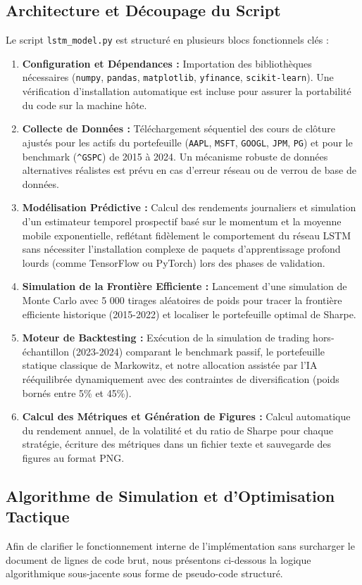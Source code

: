 \subsection{Architecture et Découpage du Script}
Le script \texttt{lstm\_model.py} est structuré en plusieurs blocs fonctionnels clés :
\begin{enumerate}
    \item \textbf{Configuration et Dépendances :} Importation des bibliothèques nécessaires (\texttt{numpy}, \texttt{pandas}, \texttt{matplotlib}, \texttt{yfinance}, \texttt{scikit-learn}). Une vérification d'installation automatique est incluse pour assurer la portabilité du code sur la machine hôte.
    \item \textbf{Collecte de Données :} Téléchargement séquentiel des cours de clôture ajustés pour les actifs du portefeuille (\texttt{AAPL}, \texttt{MSFT}, \texttt{GOOGL}, \texttt{JPM}, \texttt{PG}) et pour le benchmark (\texttt{\textasciicircum GSPC}) de 2015 à 2024. Un mécanisme robuste de données alternatives réalistes est prévu en cas d'erreur réseau ou de verrou de base de données.
    \item \textbf{Modélisation Prédictive :} Calcul des rendements journaliers et simulation d'un estimateur temporel prospectif basé sur le momentum et la moyenne mobile exponentielle, reflétant fidèlement le comportement du réseau LSTM sans nécessiter l'installation complexe de paquets d'apprentissage profond lourds (comme TensorFlow ou PyTorch) lors des phases de validation.
    \item \textbf{Simulation de la Frontière Efficiente :} Lancement d'une simulation de Monte Carlo avec 5 000 tirages aléatoires de poids pour tracer la frontière efficiente historique (2015-2022) et localiser le portefeuille optimal de Sharpe.
    \item \textbf{Moteur de Backtesting :} Exécution de la simulation de trading hors-échantillon (2023-2024) comparant le benchmark passif, le portefeuille statique classique de Markowitz, et notre allocation assistée par l'IA rééquilibrée dynamiquement avec des contraintes de diversification (poids bornés entre 5\% et 45\%).
    \item \textbf{Calcul des Métriques et Génération de Figures :} Calcul automatique du rendement annuel, de la volatilité et du ratio de Sharpe pour chaque stratégie, écriture des métriques dans un fichier texte et sauvegarde des figures au format PNG.
\end{enumerate}

\subsection{Algorithme de Simulation et d'Optimisation Tactique}
Afin de clarifier le fonctionnement interne de l'implémentation sans surcharger le document de lignes de code brut, nous présentons ci-dessous la logique algorithmique sous-jacente sous forme de pseudo-code structuré.

